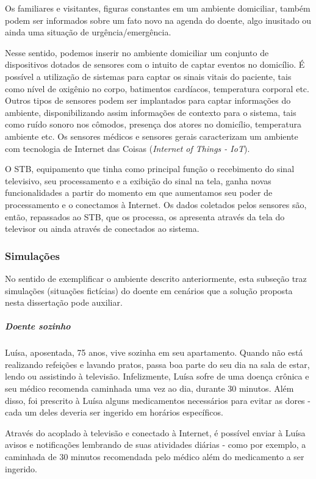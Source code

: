 Os familiares e visitantes, figuras constantes em um ambiente domiciliar, também
podem ser informados sobre um fato novo na agenda do doente, algo inusitado ou 
ainda uma situação de urgência/emergência.

Nesse sentido, podemos inserir no ambiente domiciliar um conjunto de
dispositivos dotados de sensores com o intuito de captar eventos no domicílio. É
possível a utilização de sistemas para captar os sinais vitais do paciente, tais
como nível de oxigênio no corpo, batimentos cardíacos, temperatura corporal etc.
Outros tipos de sensores podem ser implantados para captar informações do
ambiente, disponibilizando assim informações de contexto para o sistema,  tais
como ruído sonoro nos cômodos, presença dos atores no domicílio, temperatura
ambiente etc. Os sensores médicos e sensores gerais caracterizam um  ambiente 
com tecnologia de Internet das Coisas (\textit{Internet of Things  - IoT}).

O STB, equipamento que tinha como principal função o recebimento do sinal
televisivo, seu processamento e a exibição do sinal na tela, ganha novas
funcionalidades a partir do momento em que aumentamos seu  poder de
processamento e o conectamos à Internet. Os dados coletados pelos sensores são,
então, repassados ao STB, que os processa, os apresenta através da tela do
televisor ou ainda através de \smartphones[] conectados ao sistema.

\subsubsection{Simulações} \label{subsubsec:simulacoes-A}

No sentido de exemplificar o ambiente descrito anteriormente, esta subseção
traz simulações (situações fictícias) do doente em cenários que a solução
proposta nesta dissertação pode auxiliar.

\subparagraph{Doente sozinho}

Luísa, aposentada, 75 anos, vive sozinha em seu apartamento. Quando não está
realizando refeições e lavando pratos, passa boa parte do seu dia na sala de
estar, lendo ou assistindo à televisão. Infelizmente, Luísa sofre de uma doença 
crônica e seu médico recomenda caminhada uma vez ao dia, durante 30 minutos. 
Além disso, foi prescrito à Luísa alguns medicamentos necessários para evitar 
as dores - cada um deles deveria ser ingerido em horários específicos.

Através do \stb[] acoplado à televisão e conectado à Internet, é
possível enviar à Luísa avisos e notificações lembrando de suas atividades
diárias - como por exemplo, a caminhada de 30 minutos recomendada pelo
médico além do medicamento a ser ingerido.

